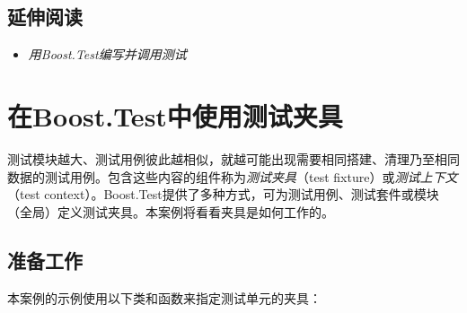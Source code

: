 
\subsection{延伸阅读}



\begin{itemize}
\item \textit{用Boost.Test编写并调用测试}

\end{itemize}



\section{在Boost.Test中使用测试夹具}



测试模块越大、测试用例彼此越相似，就越可能出现需要相同搭建、清理乃至相同数据的测试用例。包含这些内容的组件称为\textit{测试夹具}（test fixture）或\textit{测试上下文}（test context）。Boost.Test提供了多种方式，可为测试用例、测试套件或模块（全局）定义测试夹具。本案例将看看夹具是如何工作的。



\subsection{准备工作}



本案例的示例使用以下类和函数来指定测试单元的夹具：



